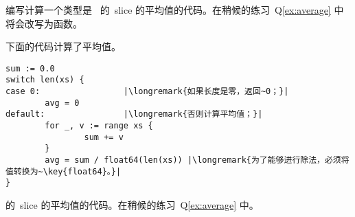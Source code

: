 \begin{Exercise}[title={Average},difficulty=4]
\label{ex:average no func}
\Question\label{ex:average no func q1} 编写计算一个类型是~
 的~slice 的平均值的代码。在稍候的练习~Q\ref{ex:average} 
中将会改写为函数。
\end{Exercise}

\begin{Answer}
\Question 下面的代码计算了平均值。
\begin{lstlisting}
sum := 0.0 
switch len(xs) {
case 0:                 |\longremark{如果长度是零，返回~0；}|
        avg = 0
default:                |\longremark{否则计算平均值；}|
        for _, v := range xs {
                sum += v
        }
        avg = sum / float64(len(xs)) |\longremark{为了能够进行除法，必须将值转换为~\key{float64}。}|
}
\end{lstlisting}
\showremarks
\end{Answer}
 的~slice 的平均值的代码。在稍候的练习~Q\ref{ex:average} 中。
